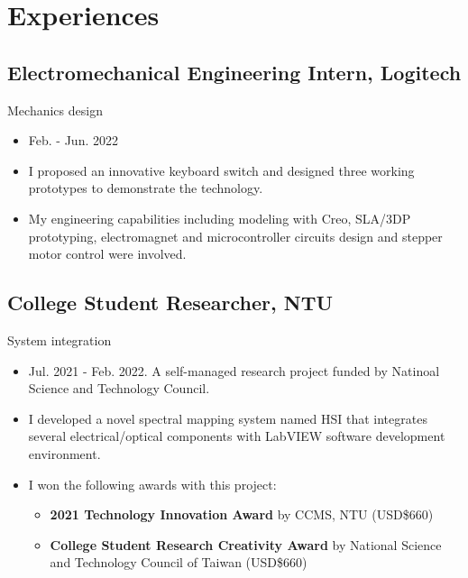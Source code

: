 \documentclass[12pt]{article}
\begin{document}
    \section*{Experiences
    }
        \subsection*{Electromechanical Engineering Intern, Logitech}
        {\sffamily
        Mechanics design
        \begin{itemize}
            \item Feb. - Jun. 2022
            \item I proposed an innovative keyboard switch and designed three working prototypes to demonstrate the technology.
            \item My engineering capabilities including modeling with Creo, SLA/3DP prototyping, electromagnet and microcontroller circuits design and stepper motor control were involved.
        \end{itemize}
        }
        \subsection*{College Student Researcher, NTU}
        {\sffamily
        System integration
        \begin{itemize}
            \item Jul. 2021 - Feb. 2022. A self-managed research project funded by Natinoal Science and Technology Council.
            \item I developed a novel spectral mapping system named HSI that integrates several electrical/optical components with LabVIEW software development environment. %
            \item I won the following awards with this project: 
            \begin{itemize}
                \item \textbf{2021 Technology Innovation Award} by CCMS, NTU (USD\$660)
                \item \textbf{College Student Research Creativity Award} by National Science and Technology Council of Taiwan (USD\$660)
            \end{itemize}
        \end{itemize}}
\end{document}

